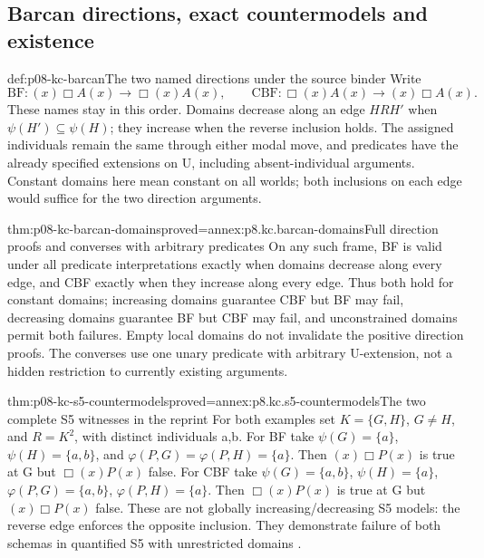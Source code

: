 \subsection{Barcan directions, exact countermodels and existence}

\begin{hbdefinition}{def:p08-kc-barcan}{The two named directions under the source binder}
Write
\[
 \mathrm{BF}:(x)\Box A(x)\to\Box(x)A(x),\qquad
 \mathrm{CBF}:\Box(x)A(x)\to(x)\Box A(x).
\]
These names stay in this order. Domains decrease along an edge
\(HRH'\) when \(\psi(H')\subseteq\psi(H)\); they increase
when the reverse inclusion holds. The assigned individuals remain
the same through either modal move, and predicates have the already
specified extensions on U, including absent-individual arguments.
Constant domains here mean constant on all worlds; both inclusions
on each edge would suffice for the two direction arguments.
\end{hbdefinition}

\begin{hbtheorem}{thm:p08-kc-barcan-domains}{proved=annex:p8.kc.barcan-domains}{Full direction proofs and converses with arbitrary predicates}
On any such frame, BF is valid under all predicate interpretations
exactly when domains decrease along every edge, and CBF exactly when
they increase along every edge. Thus both hold for constant domains;
increasing domains guarantee CBF but BF may fail, decreasing domains
guarantee BF but CBF may fail, and unconstrained domains permit both
failures. Empty local domains do not invalidate the positive direction
proofs. The converses use one unary predicate with arbitrary U-extension,
not a hidden restriction to currently existing arguments.
\end{hbtheorem}

\begin{hbtheorem}{thm:p08-kc-s5-countermodels}{proved=annex:p8.kc.s5-countermodels}{The two complete S5 witnesses in the reprint}
For both examples set \(K=\{G,H\}\), \(G\ne H\), and
\(R=K^2\), with distinct individuals a,b.
For BF take \(\psi(G)=\{a\}\), \(\psi(H)=\{a,b\}\),
and \(\varphi(P,G)=\varphi(P,H)=\{a\}\).
Then \((x)\Box P(x)\) is true at G but \(\Box(x)P(x)\)
false. For CBF take \(\psi(G)=\{a,b\}\), \(\psi(H)=\{a\}\),
\(\varphi(P,G)=\{a,b\}\), \(\varphi(P,H)=\{a\}\).
Then \(\Box(x)P(x)\) is true at G but \((x)\Box P(x)\)
false. These are not globally increasing/decreasing S5 models:
the reverse edge enforces the opposite inclusion. They demonstrate
failure of both schemas in quantified S5 with unrestricted domains
\cite[pp.~67--68]{Kripke1971ConsiderationsReprint}.
\end{hbtheorem}

